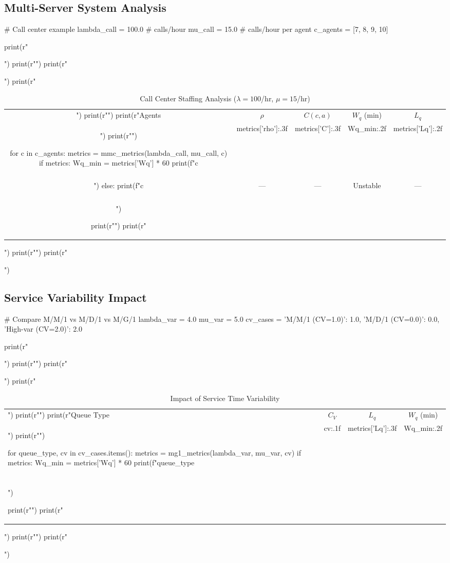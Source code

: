 \documentclass[a4paper, 11pt]{article}
\begin{document}
\subsection{Multi-Server System Analysis}

\begin{pycode}
# Call center example
lambda_call = 100.0  # calls/hour
mu_call = 15.0       # calls/hour per agent
c_agents = [7, 8, 9, 10]

print(r"\begin{table}[htbp]")
print(r"\centering")
print(r"\caption{Call Center Staffing Analysis ($\lambda=100$/hr, $\mu=15$/hr)}")
print(r"\begin{tabular}{ccccc}")
print(r"\toprule")
print(r"Agents & $\rho$ & $C(c,a)$ & $W_q$ (min) & $L_q$ \\")
print(r"\midrule")

for c in c_agents:
    metrics = mmc_metrics(lambda_call, mu_call, c)
    if metrics:
        Wq_min = metrics['Wq'] * 60
        print(f"{c} & {metrics['rho']:.3f} & {metrics['C']:.3f} & {Wq_min:.2f} & {metrics['Lq']:.2f} \\\\")
    else:
        print(f"{c} & --- & --- & Unstable & --- \\\\")

print(r"\bottomrule")
print(r"\end{tabular}")
print(r"\label{tab:callcenter}")
print(r"\end{table}")
\end{pycode}

\subsection{Service Variability Impact}

\begin{pycode}
# Compare M/M/1 vs M/D/1 vs M/G/1
lambda_var = 4.0
mu_var = 5.0
cv_cases = {'M/M/1 (CV=1.0)': 1.0,
            'M/D/1 (CV=0.0)': 0.0,
            'High-var (CV=2.0)': 2.0}

print(r"\begin{table}[htbp]")
print(r"\centering")
print(r"\caption{Impact of Service Time Variability}")
print(r"\begin{tabular}{lccc}")
print(r"\toprule")
print(r"Queue Type & $C_V$ & $L_q$ & $W_q$ (min) \\")
print(r"\midrule")

for queue_type, cv in cv_cases.items():
    metrics = mg1_metrics(lambda_var, mu_var, cv)
    if metrics:
        Wq_min = metrics['Wq'] * 60
        print(f"{queue_type} & {cv:.1f} & {metrics['Lq']:.3f} & {Wq_min:.2f} \\\\")

print(r"\bottomrule")
print(r"\end{tabular}")
print(r"\label{tab:variability}")
print(r"\end{table}")
\end{pycode}
\end{document}

